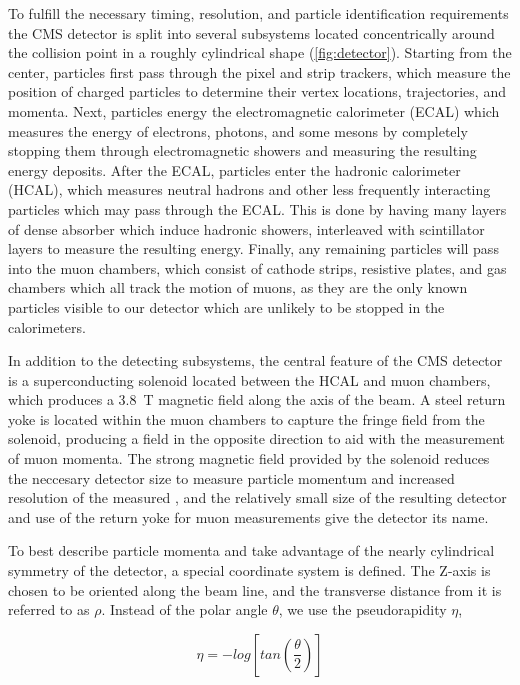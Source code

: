 To fulfill the necessary timing, resolution, and particle identification requirements the CMS detector is split into several subsystems located concentrically around the collision point in a roughly cylindrical shape (\cref{fig:detector}). 
Starting from the center, particles first pass through the pixel and strip trackers, which measure the position of charged particles to determine their vertex locations, trajectories, and momenta.
Next, particles energy the electromagnetic calorimeter (ECAL) which measures the energy of electrons, photons, and some mesons by completely stopping them through electromagnetic showers and measuring the resulting energy deposits.
After the ECAL, particles enter the hadronic calorimeter (HCAL), which measures neutral hadrons and other less frequently interacting particles which may pass through the ECAL. This is done by having many layers of dense absorber which induce hadronic showers, interleaved with scintillator layers to measure the resulting energy.
Finally, any remaining particles will pass into the muon chambers, which consist of cathode strips, resistive plates, and gas chambers which all track the motion of muons, as they are the only known particles visible to our detector which are unlikely to be stopped in the calorimeters.

In addition to the detecting subsystems, the central feature of the CMS detector is a superconducting solenoid located between the HCAL and muon chambers, which produces a \SI{3.8}{\tesla} magnetic field along the axis of the beam. 
A steel return yoke is located within the muon chambers to capture the fringe field from the solenoid, producing a field in the opposite direction to aid with the measurement of muon momenta.
The strong magnetic field provided by the solenoid reduces the neccesary detector size to measure particle momentum and increased resolution of the measured \pt, and the relatively small size of the resulting detector and use of the return yoke for muon measurements give the detector its name.

To best describe particle momenta and take advantage of the nearly cylindrical symmetry of the detector, a special coordinate system is defined. 
The Z-axis is chosen to be oriented along the beam line, and the transverse distance from it is referred to as $\rho$. 
Instead of the polar angle $\theta$, we use the pseudorapidity $\eta$,

\begin{equation}
    \label{eq:pseudo}
    \eta = - log \left[tan\left(\frac{\theta}{2}\right)\right]
\end{equation}

